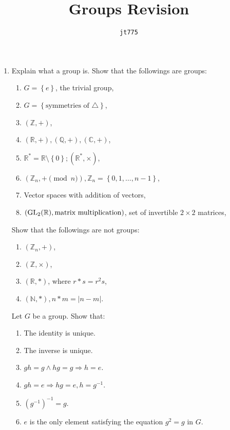 \documentclass[11pt]{article}
\title{\textbf{Groups Revision}}
\author{\texttt{jt775}}
\date{\null}
\newlength{\qspace}
\newcounter{qnumber}
\newenvironment{question}%
 {\vspace{\qspace}
  \begin{enumerate}[\bfseries 1\quad][10]%
    \setcounter{enumi}{\value{qnumber}}%
    \item%
 }
{
  \end{enumerate}
  \filbreak
  \stepcounter{qnumber}
 }
\begin{document}
\maketitle
\vspace{-1.5cm}
\begin{question}
  Explain what a group is. Show that the followings are groups:

\begin{multicols}{2}
  \begin{enumerate}
    \item $G = \left\{ e\right\}$, the trivial group,
    \item $ G = \left\{ \text{symmetries of } \triangle \right\} $,
    \item $ (\mathbb{Z} , +) $,
    \item $ (\mathbb{R} ,+), (\mathbb{Q} , +), (\mathbb{C} , +) $,
    \item $ \mathbb{R}^* = \mathbb{R} \setminus \left\{ 0\right\}; (\mathbb{R}^*, \times) $,
    \item $ (\mathbb{Z}_n, + \pmod n), \mathbb{Z}_n = \left\{ 0,1,\dots, n-1\right\} $,
    \item Vector spaces with addition of vectors,
    \item $ (\rm{GL}_2(\mathbb{R}), \text{matrix multiplication}) $, set of invertible $2\times 2$ matrices,
\end{enumerate}
\end{multicols}

Show that the followings are not groups:

\begin{multicols}{2}
  \begin{enumerate}
    \item $ (\mathbb{Z}_n, +) $,
    \item $ (\mathbb{Z} , \times) $,
    \item $ (\mathbb{R} , *) $, where $ r*s = r^2 s $,
    \item $ (\mathbb{N}, *), n*m = |n-m| $.
  \end{enumerate}
\end{multicols}

Let $G$ be a group. Show that:

\begin{multicols}{2}
  \begin{enumerate}
    \item The identity is unique.
    \item The inverse is unique.
    \item $ gh=g \land hg=g \Rightarrow h=e $.
    \item $ gh=e \Rightarrow hg=e, h=g^{-1} $.
    \item $ (g^{-1})^{-1}=g $.
    \item $e$ is the only element satisfying the equation $g^2 = g$ in $G$.
\end{enumerate}
\end{multicols}


\end{question}
\end{document}
